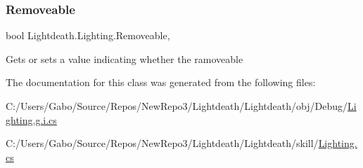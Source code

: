 \subsubsection{\texorpdfstring{Removeable}{Removeable}}
{\footnotesize\ttfamily bool Lightdeath.\+Lighting.\+Removeable\hspace{0.3cm}{\ttfamily [get]}, {\ttfamily [set]}}



Gets or sets a value indicating whether the ramoveable 



The documentation for this class was generated from the following files\+:\begin{DoxyCompactItemize}
\item 
C\+:/\+Users/\+Gabo/\+Source/\+Repos/\+New\+Repo3/\+Lightdeath/\+Lightdeath/obj/\+Debug/\hyperlink{_lighting_8g_8i_8cs}{Lighting.\+g.\+i.\+cs}\item 
C\+:/\+Users/\+Gabo/\+Source/\+Repos/\+New\+Repo3/\+Lightdeath/\+Lightdeath/skill/\hyperlink{_lighting_8cs}{Lighting.\+cs}\end{DoxyCompactItemize}

